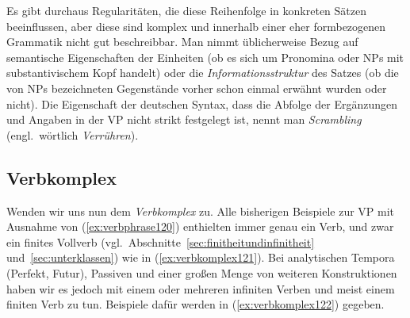Es gibt durchaus Regularitäten, die diese Reihenfolge in konkreten Sätzen beeinflussen, aber diese sind komplex und innerhalb einer eher formbezogenen Grammatik nicht gut beschreibbar.
Man nimmt üblicherweise Bezug auf semantische Eigenschaften der Einheiten (\zB ob es sich um Pronomina oder NPs mit substantivischem Kopf handelt) oder die \textit{Informationsstruktur} des Satzes (\zB ob die von NPs bezeichneten Gegenstände vorher schon einmal erwähnt wurden oder nicht).
Die Eigenschaft der deutschen Syntax, dass die Abfolge der Ergänzungen und Angaben in der VP nicht strikt festgelegt ist, nennt man \textit{Scrambling} (engl.\ wörtlich \textit{Verrühren}).


\subsection{Verbkomplex}
\label{sec:verbkomplex}


Wenden wir uns nun dem \textit{Verbkomplex} zu.
Alle bisherigen Beispiele zur VP mit Ausnahme von (\ref{ex:verbphrase120}) enthielten immer genau ein Verb, und zwar ein finites Vollverb (vgl.\ Abschnitte~\ref{sec:finitheitundinfinitheit} und~\ref{sec:unterklassen}) wie in (\ref{ex:verbkomplex121}).
Bei analytischen Tempora (Perfekt, Futur), Passiven und einer großen Menge von weiteren Konstruktionen haben wir es jedoch mit einem oder mehreren infiniten Verben und meist einem finiten Verb zu tun.
Beispiele dafür werden in (\ref{ex:verbkomplex122}) gegeben.

\begin{exe}
  \ex\label{ex:verbkomplex122}
  \begin{xlist}
  \end{xlist}
\end{exe}

